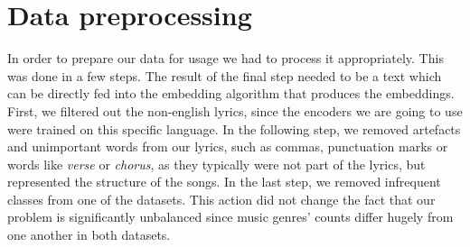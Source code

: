 \section{Data preprocessing}
In order to prepare our data for usage we had to process it appropriately. This was done in a few steps. The result of the final step needed to be a text which can be directly fed into the embedding algorithm that produces the embeddings. First, we filtered out the non-english lyrics, since the encoders we are going to use were trained on this specific language. In the following step, we removed artefacts and unimportant words from our lyrics, such as commas, punctuation marks or words like \textit{verse} or \textit{chorus}, as they typically were not part of the lyrics, but represented the structure of the songs. In the last step, we removed infrequent classes from one of the datasets. This action did not change the fact that our problem is significantly unbalanced since music genres' counts differ hugely from one another in both datasets. 


